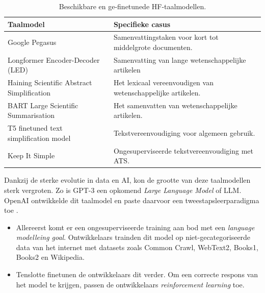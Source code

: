 \medspace

\begin{center}
	\begin{table}[H]
	\begin{tabular}{ | m{4cm} | m{12cm} | } 
		\hline
		\textbf{Taalmodel} & \textbf{Specifieke casus} \\ \hline
		Google Pegasus & Samenvattingstaken voor kort tot middelgrote documenten. \\
		\hline
		Longformer Encoder-Decoder (LED) & Samenvatting van lange wetenschappelijke artikelen \\
		\hline
		Haining Scientific Abstract Simplification & Het lexicaal vereenvoudigen van wetenschappelijke artikelen. \\
		\hline
		BART Large Scientific Summarisation & Het samenvatten van wetenschappelijke artikelen. \\
		\hline
		T5 finetuned text simplification model & Tekstvereenvoudiging voor algemeen gebruik. \\
		\hline
		Keep It Simple & Ongesuperviseerde tekstvereenvoudiging met ATS. \\
		\hline
	\end{tabular}
		\caption{Beschikbare en ge-finetunede HF-taalmodellen.}
		\label{table:huggingface-models}
	\end{table}
\end{center}

\medspace

Dankzij de sterke evolutie in data en AI, kon de grootte van deze taalmodellen sterk vergroten. Zo is GPT-3 een opkomend \textit{Large Language Model} of LLM. OpenAI ontwikkelde dit taalmodel en paste daarvoor een tweestapsleerparadigma toe \autocite{Radford2019, Li2022}. 

\begin{itemize}
	\item Allereerst komt er een ongesuperviseerde training aan bod met een \textit{language modelleing goal}. Ontwikkelaars trainden dit model op niet-gecategoriseerde data van het internet met datasets zoals Common Crawl, WebText2, Books1, Books2 en Wikipedia.
	\item Tenslotte finetunen de ontwikkelaars dit verder. Om een correcte respons van het model te krijgen, passen de ontwikkelaars \textit{reinforcement learning} toe.
\end{itemize}

